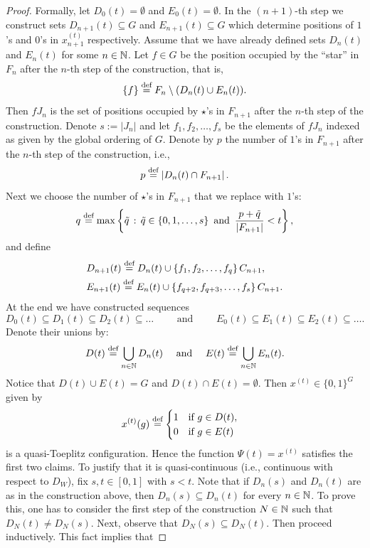 \begin{proof}
Formally, let $D_0(t)=\emptyset$ and $E_0(t)=\emptyset$. In the $(n+1)$-th step we construct sets $D_{n+1}(t)\subseteq G$ and  $E_{n+1}(t)\subseteq G$ which determine positions of $1$'s and $0$'s in $x_{n+1}^{(t)}$ respectively.
Assume that we have already defined sets $D_n(t)$ and $E_n(t)$ for some $n\in\mathbb{N}$. Let $f\in G$  be the position occupied by the ``star'' in $F_{n}$ after the $n$-th step of the construction, that is,
\[
\{f\}\stackrel{\textup{def}}{=} F_{n}\setminus(D_n(t)\cup E_n(t)).
\]
Then $fJ_n$ is the set of positions occupied by $\star$'s in $F_{n+1}$ after the $n$-th step of the construction. Denote $s:=|J_n|$ and let  $f_1,f_2,\ldots, f_s$ be the elements of $fJ_n$ indexed as given by the global ordering of $G$. Denote by $p$ the number of $1$'s in $F_{n+1}$ after the $n$-th step of the construction, i.e.,
 \[
 p\stackrel{\textup{def}}{=} \left|D_n(t)\cap F_{n+1}\right|.
 \]
 Next we choose the number of $\star$'s in $F_{n+1}$ that we replace with $1$'s:
\begin{equation}\label{eq:def_q}
q\stackrel{\textup{def}}{=}\max\left\{\tilde q\,:\, \tilde q\in\{0,1,\ldots, s\} \,\text{ and }\, \frac{p+\tilde q}{|F_{n+1}|}< t\right\},
\end{equation}
and define 
\begin{align*}
&D_{n+1}(t)\stackrel{\textup{def}}{=} D_n(t)\cup\left\{f_1,f_2,\ldots,f_q\right\}C_{n+1},
\\
&E_{n+1}(t)\stackrel{\textup{def}}{=} E_n(t)\cup\left\{f_{q+2},f_{q+3},\ldots,f_s\right\} C_{n+1}.
\end{align*}
At the end we have constructed sequences 
\[
D_0(t)\subseteq D_1(t)\subseteq D_2(t)\subseteq\ldots \quad\quad\text{ and }\quad \quad E_0(t)\subseteq E_1(t)\subseteq E_2(t)\subseteq\ldots .
\] 
Denote their unions by:
\[
D(t)\stackrel{\textup{def}}{=} \bigcup_{n\in\mathbb{N}}D_n(t)\quad \text{ and }\quad E(t)\stackrel{\textup{def}}{=} \bigcup_{n\in\mathbb{N}}E_n(t).
\]
Notice that $D(t)\cup E(t)=G$ and $D(t)\cap E(t)=\emptyset$. Then $x^{(t)}\in\{0,1\}^G$ given by 
 \begin{equation*}
x^{(t)}(g)\stackrel{\textup{def}}{=} \begin{cases} 1\quad\text{if }g\in D(t),\\
0\quad\text{if }g\in E(t)
\end{cases}
\end{equation*}
is a quasi-Toeplitz configuration. Hence the function $\Psi(t)= x^{(t)}$ satisfies the first two claims.
To justify that it is quasi-continuous (i.e., continuous with respect to $D_W$), fix $s,t\in [0,1]$ with $s<t$. Note that if $D_n(s)$ and $D_n(t)$  are as in the construction above, then $D_n(s)\subseteq D_n(t)$ for every $n\in\mathbb{N}$. To prove this, one has to consider the first step of the construction $N\in\mathbb{N}$ such that $D_N(t)\neq D_N(s)$. Next, observe that $D_N(s)\subseteq D_N(t)$. Then proceed inductively. This fact implies that

\end{proof}
